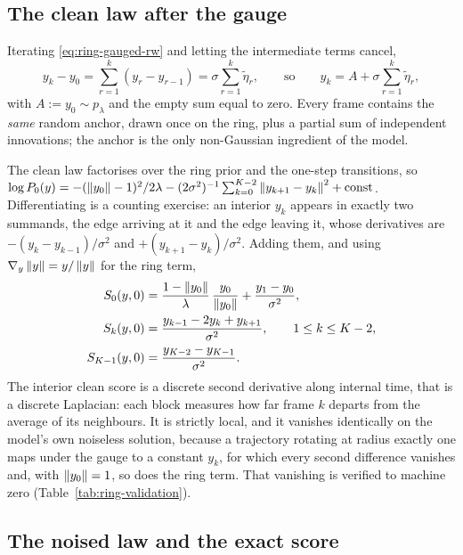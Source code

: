 \subsection{The clean law after the gauge}

Iterating \eqref{eq:ring-gauged-rw} and letting the intermediate terms cancel,
\begin{equation}
  y_k - y_0 = \sum_{r=1}^{k} (y_r - y_{r-1})
            = \sigma \sum_{r=1}^{k} \widetilde\eta_r ,
  \qquad\text{so}\qquad
  y_k = A + \sigma \sum_{r=1}^{k} \widetilde\eta_r ,
  \label{eq:ring-unrolled}
\end{equation}
with $A := y_0 \sim p_\lambda$ and the empty sum equal to zero. Every frame
contains the \emph{same} random anchor, drawn once on the ring, plus a partial
sum of independent innovations; the anchor is the only non-Gaussian ingredient
of the model.

The clean law factorises over the ring prior and the one-step transitions, so
$\log P_0(y) = -(\left\lVert y_0 \right\rVert-1)^2/2\lambda
- (2\sigma^2)^{-1}\sum_{k=0}^{K-2}\left\lVert y_{k+1}-y_k \right\rVert^2 + \text{const}$.
Differentiating is a counting exercise: an interior $y_k$ appears in exactly two
summands, the edge arriving at it and the edge leaving it, whose derivatives are
$-(y_k - y_{k-1})/\sigma^2$ and $+(y_{k+1} - y_k)/\sigma^2$. Adding them, and
using $\nabla_y \left\lVert y \right\rVert = y/\left\lVert y \right\rVert$ for the ring term,
\begin{align}
  S_0(y,0)
    &= \frac{1-\left\lVert y_0 \right\rVert}{\lambda}\,\frac{y_0}{\left\lVert y_0 \right\rVert}
       + \frac{y_1 - y_0}{\sigma^2},
  \notag \\
  S_k(y,0)
    &= \frac{y_{k-1} - 2y_k + y_{k+1}}{\sigma^2},
       \qquad 1 \le k \le K-2,
  \label{eq:ring-clean-score} \\
  S_{K-1}(y,0)
    &= \frac{y_{K-2}-y_{K-1}}{\sigma^2} .
  \notag
\end{align} The interior clean score is a
discrete second derivative along internal time, that is a discrete Laplacian:
each block measures how far frame $k$ departs from the average of its
neighbours. It is strictly local, and it vanishes identically on the model's
own noiseless solution, because a trajectory rotating at radius exactly one
maps under the gauge to a constant $y_k$, for which every second difference
vanishes and, with $\left\lVert y_0 \right\rVert = 1$, so does the ring term. That vanishing is
verified to machine zero (Table~\ref{tab:ring-validation}).

\subsection{The noised law and the exact score}

